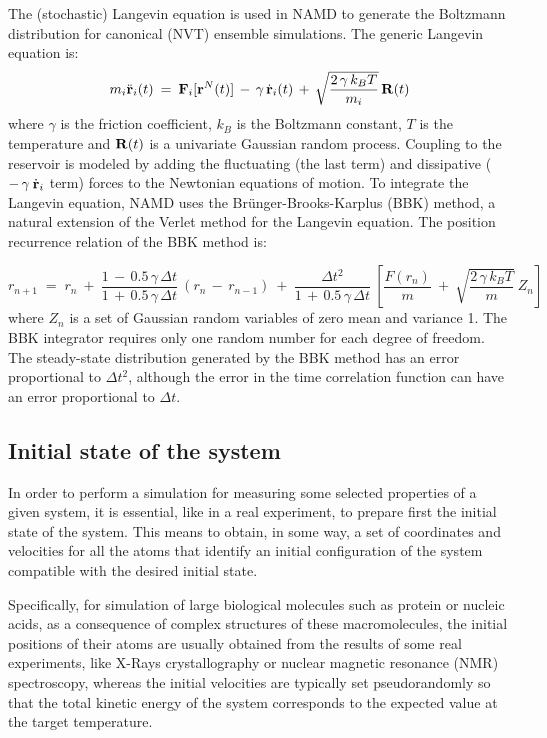 The (stochastic) Langevin equation is used in NAMD to generate the Boltzmann distribution for canonical (NVT) ensemble simulations. The generic Langevin equation is:
\begin{equation}\label{eq:NVT-Langevin}
m_i \ddot{\bold{r}}_i(t) \:=\: \bold{F}_i[\bold{r}^N(t)] \,-\, \gamma \, \dot{\bold{r}}_i(t) \,+\, \sqrt{\frac{2 \, \gamma \, k_B T}{m_i}} \, \bold{R}(t)
\end{equation}
where $\gamma$ is the friction coefficient, $k_B$ is the Boltzmann constant, $T$ is the temperature and $\bold{R}(t)$ is a univariate Gaussian random process. Coupling to the reservoir is modeled by adding the fluctuating (the last term) and dissipative ($-\,  \gamma \: \dot{\bold{r}}_i $ term) forces to the Newtonian equations of motion. To integrate the Langevin equation, NAMD uses the Br\"{u}nger-Brooks-Karplus (BBK) method, a natural extension of the Verlet method for the Langevin equation. The position recurrence relation of the BBK method is:

\begin{equation}
r_{n+1} \;=\; r_n \:+\: \frac{1 \,-\, 0.5 \, \gamma \, \Delta t}{1 \,+\, 0.5 \, \gamma \, \Delta t} \: (r_n \,-\, r_{n-1}) \:+\: \frac{\Delta t^2}{1 \,+\, 0.5 \, \gamma \, \Delta t} \: \left[ \frac{F(r_n)}{m} \:+\: \sqrt{\frac{2\, \gamma \, k_B T}{m}} \: Z_n \right]
\end{equation}
where $Z_n$ is a set of Gaussian random variables of zero mean and variance 1. The BBK integrator requires only one random number for each degree of freedom. The steady-state distribution generated by the BBK method has an error proportional to $\Delta t^2$, although the error in the time correlation function can have an error proportional to $\Delta t$.

\subsection{Initial state of the system}
In order to perform a simulation for measuring some selected properties of a given system, it is essential, like in a real experiment, to prepare first the initial state of the system. 
This means to obtain, in some way, a set of coordinates and velocities for all the atoms that identify an initial configuration of the system compatible with the desired initial state.

Specifically, for simulation of large biological molecules such as protein or nucleic acids, as a consequence of complex structures of these macromolecules, the initial positions of their atoms  are usually obtained from the results of some real experiments, like X-Rays crystallography or nuclear magnetic resonance (NMR) spectroscopy, whereas the initial velocities are typically set pseudorandomly so that the total kinetic energy of the system corresponds to the expected value at the target temperature.

